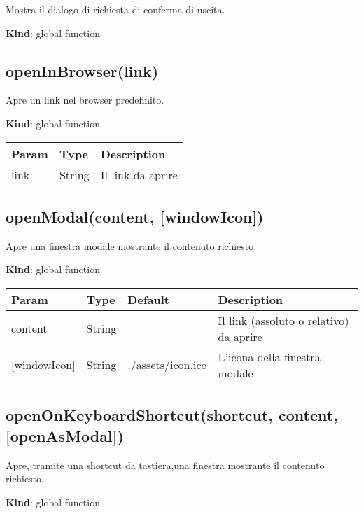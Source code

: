 Mostra il dialogo di richiesta di conferma di uscita.

\textbf{Kind}: global function\\

\hypertarget{openinbrowserlink}{%
\subsection{openInBrowser(link)}\label{openinbrowserlink}}

Apre un link nel browser predefinito.

\textbf{Kind}: global function

\begin{longtable}[]{@{}lll@{}}
\toprule
Param & Type & Description\tabularnewline
\midrule
\endhead
link & String & Il link da aprire\tabularnewline
\bottomrule
\end{longtable}

\hypertarget{openmodalcontent-windowicon}{%
\subsection{openModal(content,
{[}windowIcon{]})}\label{openmodalcontent-windowicon}}

Apre una finestra modale mostrante il contenuto richiesto.

\textbf{Kind}: global function

\begin{longtable}[]{@{}llll@{}}
\toprule
Param & Type & Default & Description\tabularnewline
\midrule
\endhead
content & String & & Il link (assoluto o relativo) da
aprire\tabularnewline
{[}windowIcon{]} & String & ./assets/icon.ico & L'icona della finestra
modale\tabularnewline
\bottomrule
\end{longtable}

\hypertarget{openonkeyboardshortcutshortcut-content-openasmodal}{%
\subsection{openOnKeyboardShortcut(shortcut, content,
{[}openAsModal{]})}\label{openonkeyboardshortcutshortcut-content-openasmodal}}

Apre, tramite una shortcut da tastiera,una finestra mostrante il
contenuto richiesto.

\textbf{Kind}: global function

